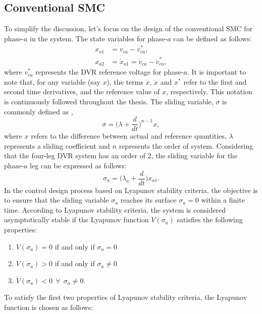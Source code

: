 \subsection{Conventional SMC}
To simplify the discussion, let's focus on the design of the conventional SMC for phase-$a$ in the system. The state variables for phase-$a$ can be defined as follows:
\begin{equation} \label{5.4(1)} %
\begin{aligned}
x_{a1}  &= v_{ca} - v^{*}_{ca}, \\
x_{a2} & = \dot{x}_{a1} = \dot{v}_{ca} - \dot{v}^{*}_{ca},
\end{aligned}
\end{equation}
where $v^{*}_{ca}$ represents the DVR reference voltage for phase-$a$. It is important to note that, for any variable (say $x$), the terms $\dot{x}$, $\ddot{x}$ and $x^{*}$ refer to the first and second time derivatives, and the reference value of $x$, respectively. This notation is continuously followed throughout the thesis. The sliding variable, $\sigma$ is commonly defined as \cite{slotine1991applied}, 
\begin{equation} \label{5.82} %
\sigma = \Big(\lambda + \frac{d}{dt}\Big)^{n-1} x,
\end{equation}
where $x$ refers to the difference between actual and reference quantities, $\lambda$ represents a sliding coefficient and $n$ represents the order of system. Considering that the four-leg DVR system has an order of 2, the sliding variable for the phase-$a$ leg can be expressed as follows:
\begin{equation} \label{5.83} %
\sigma_a = \Big(\lambda_a + \frac{d}{dt}\Big) x_{a1}.
\end{equation} 
In the control design process based on Lyapunov stability criteria, the objective is to ensure that the sliding variable $\sigma_a$ reaches its surface $\sigma_a = 0$ within a finite time. According to Lyapunov stability criteria, the system is considered asymptotically stable if the Lyapunov function $V(\sigma_a)$ satisfies the following properties:
\begin{enumerate}
	\item $V(\sigma_{a}) = 0$ if and only if $\sigma_{a} = 0$
	\item $V(\sigma_{a}) > 0$ if and only if $\sigma_{a} \neq 0$
	\item $\dot{V}(\sigma_{a}) < 0 ~~ \forall ~~ \sigma_{a} \neq 0$.  
\end{enumerate}
To satisfy the first two properties of Lyapunov stability criteria, the Lyapunov function is chosen as follows:
